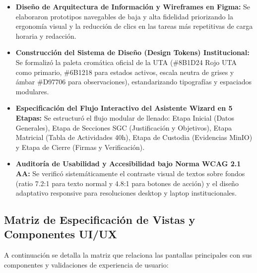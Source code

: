\documentclass[12pt,a4paper]{article}
\begin{document}
\begin{itemize}[leftmargin=1.5em, itemsep=4pt]
    \item \textbf{Diseño de Arquitectura de Información y Wireframes en Figma:} Se elaboraron prototipos navegables de baja y alta fidelidad priorizando la ergonomía visual y la reducción de clics en las tareas más repetitivas de carga horaria y redacción.
    \item \textbf{Construcción del Sistema de Diseño (Design Tokens) Institucional:} Se formalizó la paleta cromática oficial de la UTA (\#8B1D24 Rojo UTA como primario, \#6B1218 para estados activos, escala neutra de grises y ámbar \#D97706 para observaciones), estandarizando tipografías y espaciados modulares.
    \item \textbf{Especificación del Flujo Interactivo del Asistente Wizard en 5 Etapas:} Se estructuró el flujo modular de llenado: Etapa Inicial (Datos Generales), Etapa de Secciones SGC (Justificación y Objetivos), Etapa Matricial (Tabla de Actividades 40h), Etapa de Custodia (Evidencias MinIO) y Etapa de Cierre (Firmas y Verificación).
    \item \textbf{Auditoría de Usabilidad y Accesibilidad bajo Norma WCAG 2.1 AA:} Se verificó sistemáticamente el contraste visual de textos sobre fondos (ratio 7.2:1 para texto normal y 4.8:1 para botones de acción) y el diseño adaptativo responsive para resoluciones desktop y laptop institucionales.
\end{itemize}

\subsection{Matriz de Especificación de Vistas y Componentes UI/UX}
A continuación se detalla la matriz que relaciona las pantallas principales con sus componentes y validaciones de experiencia de usuario:
\end{document}
